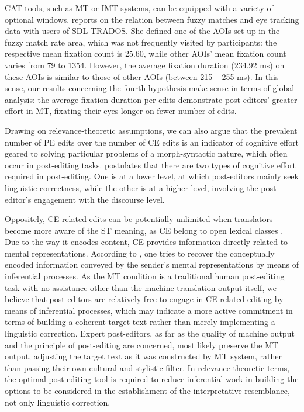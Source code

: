 \documentclass[output=paper]{langsci/langscibook}
\begin{document}
CAT tools, such as MT or IMT systems, can be equipped with a variety of optional windows. \citet{obrien2008} reports on the relation between fuzzy matches and eye tracking data with users of SDL TRADOS. She defined one of the AOIs set up in the fuzzy match rate area, which was not frequently visited by participants: the respective mean fixation count is 25.60, while other AOIs’ mean fixation count varies from 79 to 1354. However, the average fixation duration (234.92 ms) on these AOIs is similar to those of other AOIs (between 215 – 255 ms). In this sense, our results concerning the fourth hypothesis make sense in terms of global analysis: the average fixation duration per edits demonstrate post-editors’ greater effort in MT, fixating their eyes longer on fewer number of edits. 



Drawing on relevance-theoretic assumptions, we can also argue that the prevalent number of PE edits over the number of CE edits is an indicator of cognitive effort geared to solving particular problems of a morph-syntactic nature, which often occur in post-editing tasks. \citet{krings2001} postulates that there are two types of cognitive effort required in post-editing. One is at a lower level, at which post-editors mainly seek linguistic correctness, while the other is at a higher level, involving the post-editor’s engagement with the discourse level.  



Oppositely, CE-related edits can be potentially unlimited when translators become more aware of the ST meaning, as CE belong to open lexical classes \citep{moeschler1998}. Due to the way it encodes content, CE provides information directly related to mental representations. According to \citet{alves2001}, one tries to recover the conceptually encoded information conveyed by the sender’s mental representations by means of inferential processes. As the MT condition is a traditional human post-editing task with no assistance other than the machine translation output itself, we believe that post-editors are relatively free to engage in CE-related editing by means of inferential processes, which may indicate a more active commitment in terms of building a coherent target text rather than merely implementing a linguistic correction. Expert post-editors, as far as the quality of machine output and the principle of post-editing are concerned, most likely preserve the MT output, adjusting the target text as it was constructed by MT system, rather than passing their own cultural and stylistic filter. In relevance-theoretic terms, the optimal post-editing tool is required to reduce inferential work in building the options to be considered in the establishment of the interpretative resemblance, not only linguistic correction. 
\end{document}
